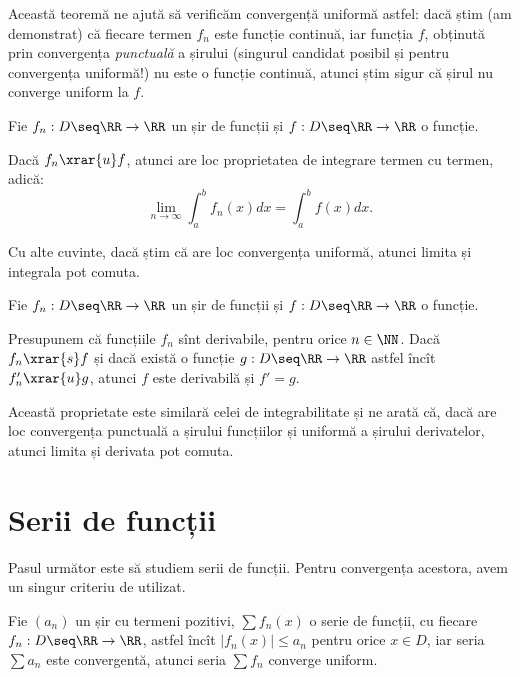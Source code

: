 Această teoremă ne ajută să verificăm convergență uniformă astfel: dacă știm
(am demonstrat) că fiecare termen $ f_n $ este funcție continuă, iar
funcția $ f $, obținută prin convergența \emph{punctuală} a șirului (singurul
candidat posibil și pentru convergența uniformă!) nu este o funcție continuă,
atunci știm sigur că șirul nu converge uniform la $ f $.

\begin{theorem}\label{thm:transf-int}
  Fie $ f_n : D \seq \RR \to \RR $ un șir de funcții și $ f : D \seq \RR \to \RR $ o
  funcție.

  Dacă $ f_n \xrar{u} f $, atunci are loc proprietatea de integrare termen
  cu termen, adică:
  \[
    \lim_{n \to \infty} \int_a^b f_n(x) dx = \int_a^b f(x) dx.
  \]
\end{theorem}

Cu alte cuvinte, dacă știm că are loc convergența uniformă, atunci limita și integrala
pot comuta.

\begin{theorem}\label{thm:transf-der}
  Fie $ f_n : D \seq \RR \to \RR $ un șir de funcții și $ f : D \seq \RR \to \RR $ o funcție.

  Presupunem că funcțiile $ f_n $ sînt derivabile, pentru orice $ n \in \NN $. Dacă
  $ f_n \xrar{s} f $ și dacă există o funcție $ g : D \seq \RR \to \RR $ astfel încît
  $ f_n' \xrar{u} g $, atunci $ f $ este derivabilă și $ f' = g $.
\end{theorem}

Această proprietate este similară celei de integrabilitate și ne arată că, dacă
are loc convergența punctuală a șirului funcțiilor și uniformă a șirului derivatelor,
atunci limita și derivata pot comuta.



\section{Serii de funcții}

Pasul următor este să studiem serii de funcții. Pentru convergența acestora,
avem un singur criteriu de utilizat.

\begin{theorem}[Weierstrass]\label{thm:weierstrass}
  Fie $ (a_n) $ un șir cu termeni pozitivi, $ \sum f_n(x) $ o serie de funcții, cu
  fiecare $ f_n : D \seq \RR \to \RR $, astfel încît $ |f_n(x)| \leq a_n $
  pentru orice $ x \in D $, iar seria $ \sum a_n $ este convergentă,
  atunci seria $ \sum f_n $ converge uniform.
\end{theorem}


